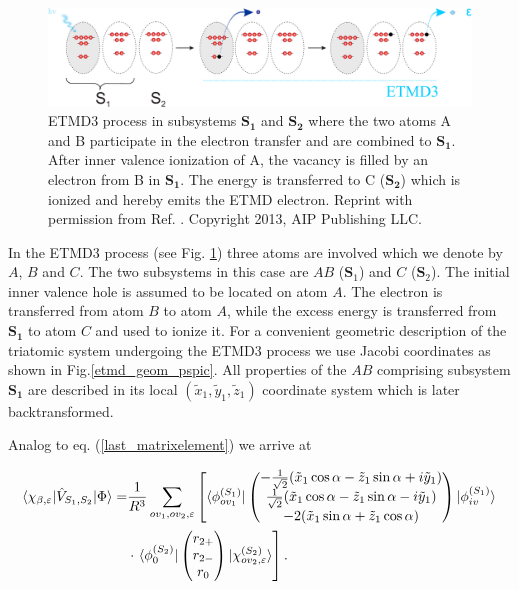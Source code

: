 \begin{figure}[ht]
\centering
\includegraphics[scale=0.30]{pics/ETMD_subsystems.pdf}
\caption{ETMD3 process in subsystems $\mathbf{S_1}$ and $\mathbf{S_2}$ where
         the two atoms A and B participate in the electron transfer and are
         combined to $\mathbf{S_1}$. After inner valence ionization of A,
         the vacancy is filled by an electron from B in $\mathbf{S_1}$.
         The energy is transferred to C ($\mathbf{S_2}$) which is ionized
         and hereby emits the ETMD electron.  Reprint with permission
         from Ref. \cite{Fasshauer13}. Copyright 2013, AIP Publishing LLC.}
\label{fancy_ETMD}
\end{figure}

In the ETMD3 process (see Fig. \ref{fancy_ETMD}) three atoms are involved
which we denote by $A$, $B$ and $C$. The two subsystems in this case are
$AB$ ($\mathbf{S}_1$) and $C$ ($\mathbf{S}_2$). The initial inner valence
hole is assumed to be located on atom $A$. The electron is transferred
from atom $B$ to atom $A$, while the excess energy is transferred from
$\mathbf{S_1}$ to atom $C$ and used to ionize it. For a convenient
geometric description of the triatomic system undergoing the ETMD3 process
we use Jacobi coordinates as shown in Fig.\ref{etmd_geom_pspic}. All
properties of the $AB$ comprising subsystem $\mathbf{S_1}$ are described in
its local $(\tilde{x}_1, \tilde{y}_1,  \tilde{z}_1)$ coordinate system which
is later backtransformed.

Analog to eq. (\ref{last_matrixelement}) we arrive at

\begin{align}\label{last_matrixelement_etmd}
 \braket{\chi_{\beta,\varepsilon}|\hat{V}_{S_1,S_2}|\Phi} 
=& \frac{1}{R^3} \sum\limits_{ov_1,ov_2,\varepsilon}  \left[
  \braket{\phi_{ov_1}^{(S_1)}|  \begin{pmatrix}
         -\frac{1}{\sqrt{2}}(\tilde{x}_1\cos\alpha- \tilde{z}_1\sin\alpha +i\tilde{y}_1)\\
         \frac{1}{\sqrt{2}}(\tilde{x}_1\cos\alpha- \tilde{z}_1\sin\alpha -i\tilde{y}_1)\\
         -2 (\tilde{x}_1\sin\alpha + \tilde{z}_1\cos\alpha )\\
         \end{pmatrix} |\phi_{iv}^{(S_1)}} \right. \nonumber \\
  & \cdot \left. \braket{\phi_{0}^{(S_2)}| \begin{pmatrix}
                            r_{2+}\\
                            r_{2-}\\
                            r_0\\
                            \end{pmatrix} |\chi_{ov_2,\varepsilon}^{(S_2)}} \right] .
\end{align}

